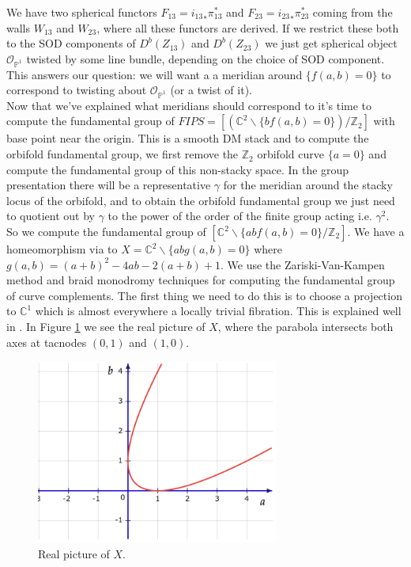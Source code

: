 \documentclass[oneside,reqno]{amsart}
\theoremstyle{definition}
\theoremstyle{definition}
\theoremstyle{definition}
\theoremstyle{definition}
\newcommand{\CC}{\mathbb{C}}
\newcommand{\PP}{\mathbb{P}}
\newcommand{\Z}{\mathbb{Z}}
\newcommand{\Os}{\mathcal{O}}
\begin{document}
We have two spherical functors $F_{13} = {i_{13}}_* \pi_{13}^*$ and $F_{23} = {i_{23}}_* \pi_{23}^*$ coming from the walls $W_{13}$ and $W_{23}$, where all these functors are derived. If we restrict these both to the SOD components of $D^b(Z_{13})$ and $D^b(Z_{23})$ we just get spherical object $\Os_{\PP^1}$ twisted by some line bundle, depending on the choice of SOD component. This answers our question:
we will want a a meridian around $\{ f(a,b)=0\}$ to correspond to twisting about $\Os_{\PP^1}$ (or a twist of it). 
\\
\newline
Now that we've explained what meridians should correspond to it's time to compute the fundamental group of $FIPS=\left[ (\CC^2 \backslash \{bf(a,b)=0\} ) / \Z_2 \right]$ with base point near the origin. This is a smooth DM stack and to compute the orbifold  fundamental group, we first remove the $\Z_2$ orbifold curve $\{ a=0\}$ and compute the fundamental group of this non-stacky space. In the group presentation there will be a representative $\gamma$ for the meridian around the stacky locus of the orbifold, and to obtain the orbifold fundamental group we just need to quotient out by $\gamma$ to the power of the order of the finite group acting i.e. $\gamma^2$.\\
\newline
So we compute the fundamental group of $[\CC^2 \backslash \{abf(a,b)=0\}/\Z_2]$. We have a homeomorphism via to $X = \CC^2 \backslash \{abg(a,b)=0\}$ where $g(a,b)=(a + b )^2 -4ab -2(a + b) +1$. We use the Zariski-Van-Kampen method and braid monodromy techniques for computing the fundamental group of curve complements. The first thing we need to do this is to choose a projection to $\CC^1$ which is almost everywhere a locally trivial fibration. This is explained well in \cite{cogolludo}. In Figure \ref{FIPS1} we see the real picture of $X$, where the parabola intersects both axes at tacnodes $(0,1)$ and $(1,0)$.
\begin{figure}[!h]
    \centering
    \includegraphics[width=8cm]{rank2exmp/FIPS1.png}
    \caption{Real picture of $X$.}
    \label{FIPS1}
\end{figure}
\end{document}
